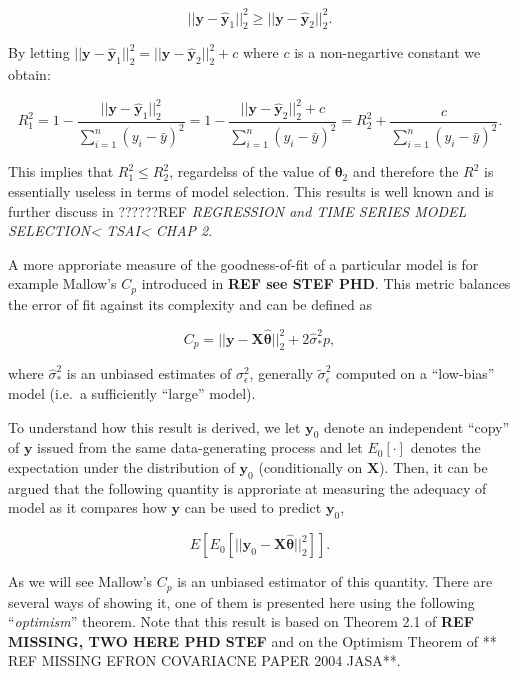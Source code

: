 \documentclass[]{book}
\theoremstyle{definition}
\theoremstyle{definition}
\theoremstyle{definition}
\theoremstyle{remark}
\begin{document}
{\[||\mathbf{y} - \hat{\mathbf{y}}_1 ||_2^2 \geq ||\mathbf{y} - \hat{\mathbf{y}}_2 ||_2^2.\]

By letting
\(||\mathbf{y} - \hat{\mathbf{y}}_1 ||_2^2 = ||\mathbf{y} - \hat{\mathbf{y}}_2 ||_2^2 + c\)
where \(c\) is a non-negartive constant we obtain:

\[R_1^2 = 1 - \frac{ ||\mathbf{y} - \hat{\mathbf{y}}_1 ||_2^2 }{ \sum_{i=1}^n \left(y_i - \bar{y}\right)^2}  = 1 - \frac{||\mathbf{y} - \hat{\mathbf{y}}_2  ||_2^2 
+ c}{\sum_{i=1}^n \left(y_i - \bar{y}\right)^2} = R_2^2 + \frac{c}{\sum_{i=1}^n \left(y_i - \bar{y}\right)^2}.\]

This implies that \(R_1^2 \leq R_2^2\), regardelss of the value of
\(\boldsymbol{\theta}_2\) and therefore the \(R^2\) is essentially
useless in terms of model selection. This results is well known and is
further discuss in ??????REF \emph{REGRESSION and TIME SERIES MODEL
SELECTION\textless{} TSAI\textless{} CHAP 2}.

A more approriate measure of the goodness-of-fit of a particular model
is for example Mallow's \(C_p\) introduced in \textbf{REF see STEF PHD}.
This metric balances the error of fit against its complexity and can be
defined as

\begin{equation}
C_p = || \mathbf{y} - \mathbf{X}\hat{\boldsymbol{\theta}}||_2^2 +  2 \hat{\sigma}_{\ast}^2 p,
\label{eq:MallowCp}
\end{equation}

where \(\hat{\sigma}_{\ast}^2\) is an unbiased estimates of
\({\sigma}_{\epsilon}^2\), generally \(\tilde{\sigma}^2_{\epsilon}\)
computed on a ``low-bias'' model (i.e.~a sufficiently ``large'' model).

To understand how this result is derived, we let \(\mathbf{y}_0\) denote
an independent ``copy'' of \(\mathbf{y}\) issued from the same
data-generating process and let \(E_0[\cdot]\) denotes the expectation
under the distribution of \(\mathbf{y}_0\) (conditionally on
\(\mathbf{X}\)). Then, it can be argued that the following quantity is
approriate at measuring the adequacy of model as it compares how
\(\mathbf{y}\) can be used to predict \(\mathbf{y}_0\),

\[E \left[ E_0 \left[ || \mathbf{y}_0 - \mathbf{X}\hat{\boldsymbol{\theta}}||_2^2 \right] \right].\]

As we will see Mallow's \(C_p\) is an unbiased estimator of this
quantity. There are several ways of showing it, one of them is presented
here using the following ``\emph{optimism}'' theorem. Note that this
result is based on Theorem 2.1 of \textbf{REF MISSING, TWO HERE PHD
STEF} and on the Optimism Theorem of ** REF MISSING EFRON COVARIACNE
PAPER 2004 JASA**.

}
\end{document}
